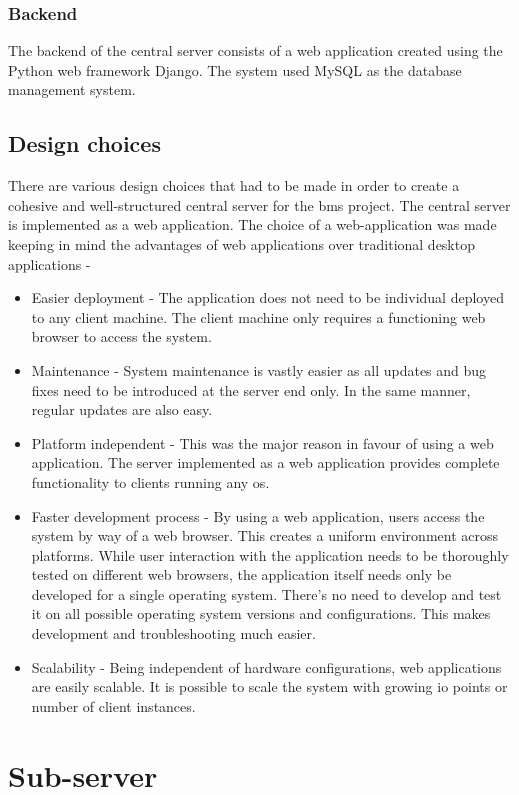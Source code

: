 \documentclass[letterpaper,11pt]{report}
\begin{document}
\subsubsection{Backend}
The backend of the central server consists of a web application created using the Python web framework Django. The system used MySQL as the database management system.
\subsection{Design choices}
There are various design choices that had to be made in order to create a cohesive and well-structured central server for the \ac{bms} project. The central server is implemented as a web application. The choice of a web-application was made keeping in mind the advantages of web applications over traditional desktop applications -
\begin{itemize}
    \item Easier deployment - The application does not need to be individual deployed to any client machine. The client machine only requires a functioning web browser to access the system.
    \item Maintenance - System maintenance is vastly easier as all updates and bug fixes need to be introduced at the server end only. In the same manner, regular updates are also easy.
    \item Platform independent - This was the major reason in favour of using a web application. The server implemented as a web application provides complete functionality to clients running any \ac{os}.
    \item Faster development process - By using a web application, users access the system by way of a web browser. This creates a uniform environment across platforms. While user interaction with the application needs to be thoroughly tested on different web browsers, the application itself needs only be developed for a single operating system. There’s no need to develop and test it on all possible operating system versions and configurations. This makes development and troubleshooting much easier.
    \item Scalability - Being independent of hardware configurations, web applications are easily scalable. It is possible to scale the system with growing \ac{io} points or number of client instances.
\end{itemize}
\section{Sub-server}
\end{document}
